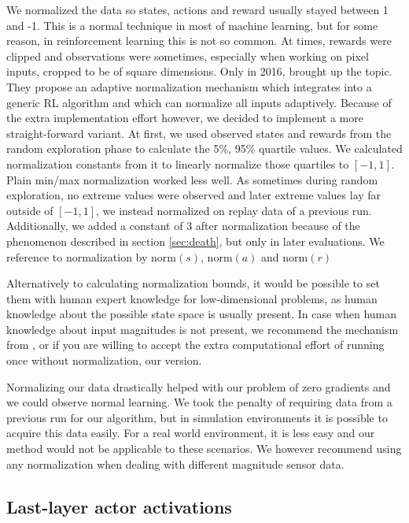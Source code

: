 \documentclass[hyperref,final,beleg]{cgvpub}
\begin{document}
We normalized the data so states, actions and reward usually stayed between 1 and -1. This is a normal technique in most of machine learning, but for some reason, in reinforcement learning this is not so common. At times, rewards were clipped \cite{mnihPlayingAtariDeep2013} and observations were sometimes, especially when working on pixel inputs, cropped to be of square dimensions. Only in 2016, \cite{vanhasseltLearningValuesMany2016} brought up the topic. They propose an adaptive normalization mechanism which integrates into a generic \ac{RL} algorithm and which can normalize all inputs adaptively. Because of the extra implementation effort however, we decided to implement a more straight-forward variant. At first, we used observed states and rewards from the random exploration phase to calculate the 5\%, 95\% quartile values. We calculated normalization constants from it to linearly normalize those quartiles to $[-1, 1]$. Plain min/max normalization worked less well. As sometimes during random exploration, no extreme values were observed and later extreme values lay far outside of $[-1, 1]$, we instead normalized on replay data of a previous run.  Additionally, we added a constant of 3 after normalization because of the phenomenon described in section \ref{sec:death}, but only in later evaluations. We reference to normalization by $\text{norm}(s)$, $\text{norm}(a)$ and $\text{norm}(r)$

Alternatively to calculating normalization bounds, it would be possible to set them with human expert knowledge for low-dimensional problems, as human knowledge about the possible state space is usually present. In case when human knowledge about input magnitudes is not present, we recommend the mechanism from \cite{vanhasseltLearningValuesMany2016}, or if you are willing to accept the extra computational effort of running once without normalization, our version.

Normalizing our data drastically helped with our problem of zero gradients and we could observe normal learning. We took the penalty of requiring data from a previous run for our algorithm, but in simulation environments it is possible to acquire this data easily. For a real world environment, it is less easy and our method would not be applicable to these scenarios. We however recommend using any normalization when dealing with different magnitude sensor data.

\subsection{Last-layer actor activations}
\label{sec:activations}
\end{document}
